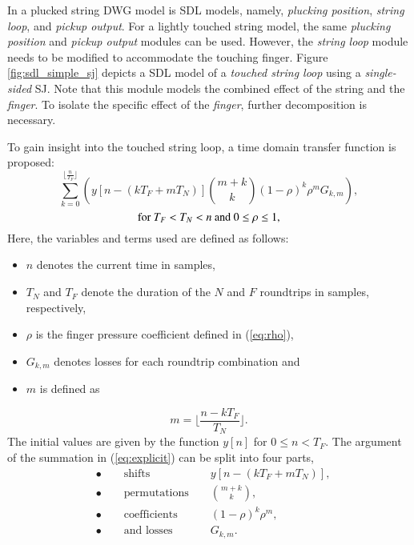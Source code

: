 \documentclass{sigchi}
\begin{document}
In \cite{karjalainen_plucked-string_1998} a plucked string DWG model is SDL models, namely, \textit{plucking position}, \textit{string loop}, and \textit{pickup output}. For a lightly touched string model, the same \textit{plucking position} and \textit{pickup output} modules can be used. However, the \textit{string loop} module needs to be modified to accommodate the touching finger. Figure \ref{fig:sdl_simple_sj} depicts a SDL model of a \textit{touched string loop} using a \textit{single-sided} SJ. Note that this module models the combined effect of the string and the \textit{finger}. To isolate the specific effect of the \textit{finger}, further decomposition is necessary.
\begin{figure*}[h]
	\centering
	\scalebox{0.8}{}
	\caption{String loop with a scattering junction.}
	\label{fig:sdl_simple_sj}
\end{figure*}
To gain insight into the touched string loop, a time domain transfer function is proposed:
\begin{equation} \label{eq:explicit}
	\sum_{k=0}^{\lfloor \frac{n}{T_F} \rfloor}\left(y[n - (kT_F + mT_N)]\binom{m+k}{k} (1 - \rho)^{k} \rho^mG_{k,m}\right),
\end{equation}
\begin{equation*}
	\textrm{for } T_F<T_N<n \textrm{ and } 0\leq\rho\leq1\notag,
\end{equation*}
Here, the variables and terms used are defined as follows:
\begin{itemize}
	\setlength\itemsep{0.1em}
	\item $n$ denotes the current time in samples,
	\item $T_N$ and $T_F$ denote the duration of the $N$ and $F$ roundtrips in samples, respectively,
	\item $\rho$ is the finger pressure coefficient defined in (\ref{eq:rho}),
	\item $G_{k,m}$ denotes losses for each roundtrip combination and
	\item $m$ is defined as
\end{itemize}
\begin{equation}
	m = \lfloor \frac{n - kT_F}{T_N} \rfloor.
\end{equation}
The initial values are given by the function $y[n]$ for $0 \leq n < T_F$. The argument of the summation in (\ref{eq:explicit}) can be split into four parts,
\begin{align}
	\label{eq:shifts}&\bullet\qquad\textrm{shifts }& &y[n - (kT_F + mT_N)], \\[1em]
	\label{eq:perm}&\bullet\qquad\textrm{permutations }& &\binom{m+k}{k}, \\[1em]
	\label{eq:coef}&\bullet\qquad\textrm{coefficients }& &(1 - \rho)^{k} \rho^m, \\[1em]
	\label{eq:loss}&\bullet\qquad\textrm{and losses }& &G_{k,m}.
\end{align}
\end{document}
